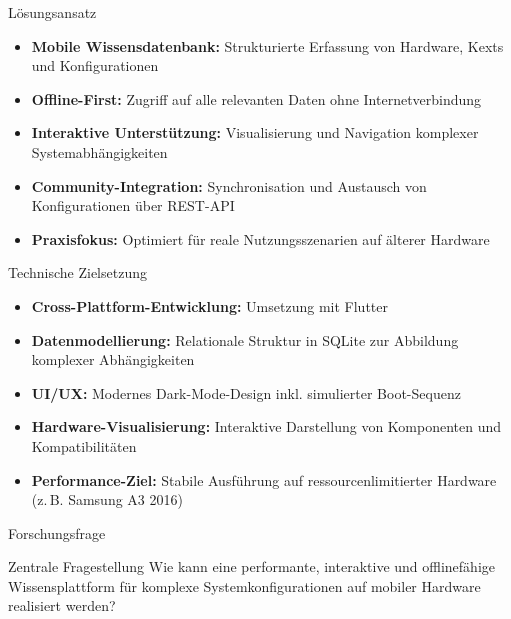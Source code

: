 \documentclass[10pt]{beamer}
\begin{document}
\begin{frame}{Lösungsansatz}
    \begin{itemize}
        \item \textbf{Mobile Wissensdatenbank:} Strukturierte Erfassung von Hardware, Kexts und Konfigurationen
        
        \item \textbf{Offline-First:} Zugriff auf alle relevanten Daten ohne Internetverbindung
        
        \item \textbf{Interaktive Unterstützung:} Visualisierung und Navigation komplexer Systemabhängigkeiten
        
        \item \textbf{Community-Integration:} Synchronisation und Austausch von Konfigurationen über REST-API
        
        \item \textbf{Praxisfokus:} Optimiert für reale Nutzungsszenarien auf älterer Hardware
    \end{itemize}
\end{frame}


\begin{frame}{Technische Zielsetzung}
    \begin{itemize}
        \item \textbf{Cross-Plattform-Entwicklung:} Umsetzung mit Flutter
        
        \item \textbf{Datenmodellierung:} Relationale Struktur in SQLite zur Abbildung komplexer Abhängigkeiten
        
        \item \textbf{UI/UX:} Modernes Dark-Mode-Design inkl. simulierter Boot-Sequenz
        
        \item \textbf{Hardware-Visualisierung:} Interaktive Darstellung von Komponenten und Kompatibilitäten
        
        \item \textbf{Performance-Ziel:} Stabile Ausführung auf ressourcenlimitierter Hardware (z.\,B. Samsung A3 2016)
    \end{itemize}
\end{frame}


\begin{frame}{Forschungsfrage}
    \begin{block}{Zentrale Fragestellung}
        Wie kann eine performante, interaktive und offlinefähige Wissensplattform
        für komplexe Systemkonfigurationen auf mobiler Hardware realisiert werden?
    \end{block}
\end{frame}
\end{document}
